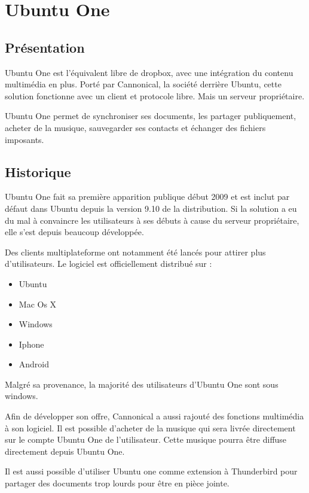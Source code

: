 \section{Ubuntu One}
\thispagestyle{EIP} %
\subsection{Présentation}
Ubuntu One est l'équivalent libre de dropbox, avec une intégration du contenu multimédia en plus. Porté par Cannonical, la société derrière Ubuntu, cette solution fonctionne avec un client et protocole libre. Mais un serveur propriétaire.

Ubuntu One permet de synchroniser ses documents, les partager publiquement, acheter de la musique, sauvegarder ses contacts et échanger des fichiers imposants.

\subsection{Historique}
Ubuntu One fait sa première apparition publique début 2009 et est inclut par défaut dans Ubuntu depuis la version 9.10 de la distribution. Si la solution a eu du mal à convaincre les utilisateurs à ses débuts à cause du serveur propriétaire, elle s'est depuis beaucoup développée.

Des clients multiplateforme ont notamment été lancés pour attirer plus d'utilisateurs. Le logiciel est officiellement distribué sur :

\begin{itemize}
\renewcommand{\labelitemi}{$\bullet$}
\item Ubuntu
\item Mac Os X
\item Windows
\item Iphone
\item Android
\end{itemize}

Malgré sa provenance, la majorité des utilisateurs d'Ubuntu One sont sous windows.

Afin de développer son offre, Cannonical a aussi rajouté des fonctions multimédia à son logiciel. Il est possible d'acheter de la musique qui sera livrée directement sur le compte Ubuntu One de l'utilisateur. Cette musique pourra être diffuse directement depuis Ubuntu One.

Il est aussi possible d'utiliser Ubuntu one comme extension à Thunderbird pour partager des documents trop lourds pour être en pièce jointe.

